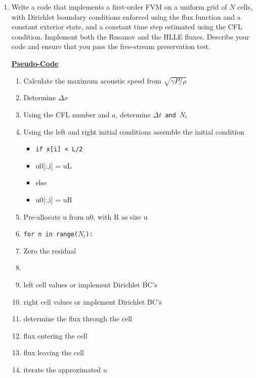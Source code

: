 \pagebreak
\begin{enumerate}[label=\alph*., start = 1]
    \item Write a code that implements a first-order FVM on a uniform grid of $N$ cells, with Dirichlet boundary conditions enforced using the flux function and a constant exterior state, and a constant time step estimated using the CFL condition. Implement both the Rusanov and the HLLE fluxes. Describe your code and ensure that you pass the free-stream preservation test.
    
    \textbf{\underline{Pseudo-Code}}
    \begin{enumerate}[label =\arabic*:]
        \item Calculate the maximum acoustic speed from $\sqrt{\gamma P/\rho}$
        \item Determine {\texttt{$\Delta x$}} 
        \item Using the CFL number and $a$, determine {\texttt{$\Delta t$ and $N_t$}}
        \item Using the left and right initial conditions assemble the initial condition
        \begin{itemize}
            \item {\texttt{if x[i] < L/2}}
            \item u0[:,i] = uL
            \item else
            \item u0[:,i] = uR
        \end{itemize}
        \item Pre-allocate u from u0, with R as size u
        \item {\texttt{for n in range($N_t$):}}
        \item {} \qquad Zero the residual 
        \item {}
        \item {} \qquad left cell values or implement Dirichlet BC's
        \item {} \qquad right cell values or implement Dirichlet BC's
        \item {} \qquad determine the flux through the cell
        \item {} \qquad flux entering the cell
        \item {} \qquad flux leaving the cell
        \item {} \qquad iterate the approximated $u$
    \end{enumerate}


\end{enumerate}
